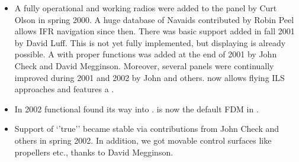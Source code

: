 {\begin{itemize}
\item A fully operational  and working radios were added to the panel by Curt Olson in spring 2000. A huge database of Navaids contributed by Robin
Peel allows IFR navigation since then. There was basic  support added in fall 2001 by David Luff. This is not yet fully implemented, but displaying  is already possible. A  with proper functions was added at the end of 2001 by John Check and David Megginson. Moreover, several panels were continually improved during 2001 and 2002 by John and others. \FlightGear{} now allows flying ILS approaches and features a .
\item In 2002 functional  found its way into \FlightGear{}. \JSBSim{} is now the default FDM in \FlightGear{}.
\item Support of `'true''  became stable via contributions from John Check and others in spring 2002. In addition, we got movable control surfaces like propellers etc., thanks to David Megginson.
\end{itemize}
}{}

